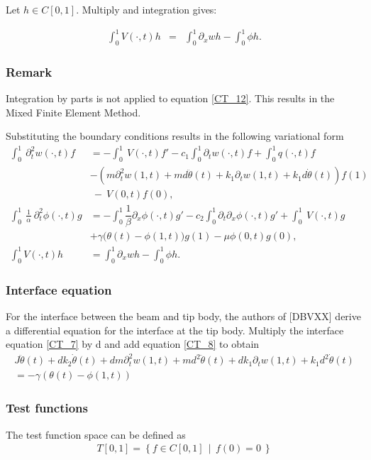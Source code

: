 \documentclass[../../main.tex]{subfiles}
\begin{document}
Let $h \in C[0,1]$. Multiply and integration gives:

\begin{eqnarray}
 \int_0^1 V(\cdot,t)h &=& \int_0^1 \partial_x wh - \int_0^1\phi h. \label{CT_12}
\end{eqnarray}

\subsubsection{Remark}
Integration by parts is not applied to equation \eqref{CT_12}. This results in the Mixed Finite Element Method.

Substituting the boundary conditions results in the following variational form
\begin{align}
\int_0^1~ \partial^2_t w(\cdot,t) f &=  - \int_0^1~ V(\cdot,t)f' - c_1\int_0^1 \partial_t w(\cdot,t)f + \int_0^1q(\cdot,t)f \nonumber \\
&  -(m \partial_t^2 w(1,t) +  md \ddot \theta(t) + k_1 \partial_t w(1,t)+ k_1 d \dot \theta(t))f(1) \nonumber\\
&~-~V(0,t)f(0), \label{CT_13}\\
 \int_0^1~ \frac{1}{\alpha}~\partial^2_t \phi(\cdot,t) g & = -\int_0^1\dfrac{1}{\beta} \partial_x \phi(\cdot,t)g' - c_2 \int_0^1 \partial_t \partial_x \phi(\cdot,t)g' +\int_0^1~V(\cdot,t)g \nonumber\\
 &  +\gamma \big(\theta(t) - \phi(1,t)\big)g(1) - \mu \phi(0,t)g(0), \label{CT_14}\\
 \int_0^1 V(\cdot,t)h &= \int_0^1 \partial_x wh - \int_0^1\phi h. \label{CT_15}
\end{align}

\subsubsection{Interface equation}
For the interface between the beam and tip body, the authors of [DBVXX] derive a differential equation for the interface at the tip body. Multiply the interface equation \eqref{CT_7} by d and add equation \eqref{CT_8} to obtain
\begin{align}
 J\ddot{\theta}(t) + dk_2\dot{\theta}(t) + dm\partial_t^2w(1,t) + md^2\ddot{\theta}(t) + dk_1\partial_tw(1,t) + k_1d^2\dot{\theta}(t)\nonumber \\
 = - \gamma(\theta(t)-\phi(1,t)) \label{CT_16}
\end{align}

\subsubsection*{Test functions}
The test function space can be defined as
\begin{align}
T[0,1] = \left\{ f \in C[0,1] ~~ | ~~ f(0)= 0~\right\} \label{CT_17}
\end{align}
\end{document}
